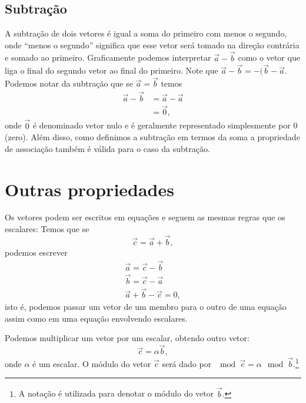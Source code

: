 \subsection{Subtração}

A subtração de dois vetores é igual a soma do primeiro com menos o segundo, onde ``menos o segundo'' significa que esse vetor será tomado na direção contrária e somado ao primeiro. Graficamente podemos interpretar $\vec{a} - \vec{b}$ como o vetor que liga o final do segundo vetor ao final do primeiro. Note que $\vec{a} - \vec{b} = -(\vec{b}-\vec{a}$. 
Podemos notar da subtração que se $\vec{a} = \vec{b}$ temos
\begin{align}
  \vec{a} - \vec{b} & = \vec{a} - \vec{a} \\
  &= \vec{0},
\end{align}
%
onde $\vec{0}$ é denominado vetor nulo e é geralmente representado simplesmente por 0 (zero).
Além disso, como definimos a subtração em termos da soma a propriedade de associação também é válida para o caso da subtração.

\section{Outras propriedades}

Os vetores podem ser escritos em equações e seguem as mesmas regras que os escalares: Temos que se
\begin{equation}
  \vec{c} = \vec{a} + \vec{b},
\end{equation}
%
podemos escrever
\begin{align}
  \vec{a} = \vec{c} - \vec{b} \\
  \vec{b} = \vec{c} - \vec{a} \\
  \vec{a} + \vec{b} - \vec{c} = 0,
\end{align}
%
isto é, podemos passar um vetor de um membro para o outro de uma equação assim como em uma equação envolvendo escalares.

Podemos multiplicar um vetor por um escalar, obtendo outro vetor:
\begin{equation}
  \vec{c} = \alpha\vec{b},
\end{equation}
%
onde $\alpha$ é um escalar. O módulo do vetor $\vec{c}$ será dado por $\mod{\vec{c}} = \alpha\mod{\vec{b}}$.\footnote{A notação  é utilizada para denotar o módulo do vetor $\vec{b}$.}

